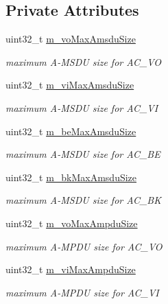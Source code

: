 \subsection*{Private Attributes}
\begin{DoxyCompactItemize}
\item 
uint32\+\_\+t \hyperlink{classns3_1_1RegularWifiMac_a1c19226e2c71d1409f3373aa9ed97a3f}{m\+\_\+vo\+Max\+Amsdu\+Size}
\begin{DoxyCompactList}\small\item\em maximum A-\/\+M\+S\+DU size for A\+C\+\_\+\+VO \end{DoxyCompactList}\item 
uint32\+\_\+t \hyperlink{classns3_1_1RegularWifiMac_a6a9e67fe94f116dc764c640e38f59a62}{m\+\_\+vi\+Max\+Amsdu\+Size}
\begin{DoxyCompactList}\small\item\em maximum A-\/\+M\+S\+DU size for A\+C\+\_\+\+VI \end{DoxyCompactList}\item 
uint32\+\_\+t \hyperlink{classns3_1_1RegularWifiMac_ab72ab6c9fc9eaf3ba8e67bc3fcf7937b}{m\+\_\+be\+Max\+Amsdu\+Size}
\begin{DoxyCompactList}\small\item\em maximum A-\/\+M\+S\+DU size for A\+C\+\_\+\+BE \end{DoxyCompactList}\item 
uint32\+\_\+t \hyperlink{classns3_1_1RegularWifiMac_a7b2f2e7317dc3945fe5db7fbc43e7d05}{m\+\_\+bk\+Max\+Amsdu\+Size}
\begin{DoxyCompactList}\small\item\em maximum A-\/\+M\+S\+DU size for A\+C\+\_\+\+BK \end{DoxyCompactList}\item 
uint32\+\_\+t \hyperlink{classns3_1_1RegularWifiMac_ab4c2cdda812a7aa484b9735c720a32fe}{m\+\_\+vo\+Max\+Ampdu\+Size}
\begin{DoxyCompactList}\small\item\em maximum A-\/\+M\+P\+DU size for A\+C\+\_\+\+VO \end{DoxyCompactList}\item 
uint32\+\_\+t \hyperlink{classns3_1_1RegularWifiMac_afe46a30087d220d0ec9fb5ec635b4ae1}{m\+\_\+vi\+Max\+Ampdu\+Size}
\begin{DoxyCompactList}\small\item\em maximum A-\/\+M\+P\+DU size for A\+C\+\_\+\+VI \end{DoxyCompactList}\item 

\end{DoxyCompactItemize}
